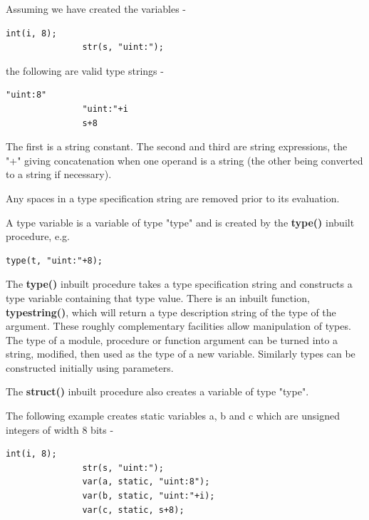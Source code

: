             Assuming we have created the variables -
            \begin{lstlisting}[gobble=12, language=threepl]
               int(i, 8);
               str(s, "uint:");
            \end{lstlisting}
            the following are valid type strings -
            \begin{lstlisting}[gobble=12, language=threepl]
               "uint:8"
               "uint:"+i
               s+8
            \end{lstlisting}
            The first is a string constant. The second and third are string
            expressions, the "+" giving concatenation when one operand is
            a string (the other being converted to a string if necessary).
            
            Any spaces in a type specification string are removed prior
            to its evaluation.
            
            A type variable is a variable of type "type" and is created by
            the {\bf type()} inbuilt procedure, e.g.
            \begin{lstlisting}[gobble=12, language=threepl]
               type(t, "uint:"+8);
            \end{lstlisting}
            The {\bf type()} inbuilt procedure takes a type specification string
            and constructs a type variable containing that type value. There is an
            inbuilt function, {\bf typestring()}, which will return a type
            description string of the type of the argument. These roughly
            complementary facilities allow manipulation of types. The type of a
            module, procedure or function argument can be turned into a string,
            modified, then used as the type of a new variable. Similarly types can
            be constructed initially using parameters.

            The {\bf struct()} inbuilt procedure also creates a variable
            of type "type".
           
            The following example creates static variables a, b and c which
            are unsigned integers of width 8 bits -
            \begin{lstlisting}[gobble=12, language=threepl]
               int(i, 8);
               str(s, "uint:");
               var(a, static, "uint:8");
               var(b, static, "uint:"+i);
               var(c, static, s+8);
            \end{lstlisting}

